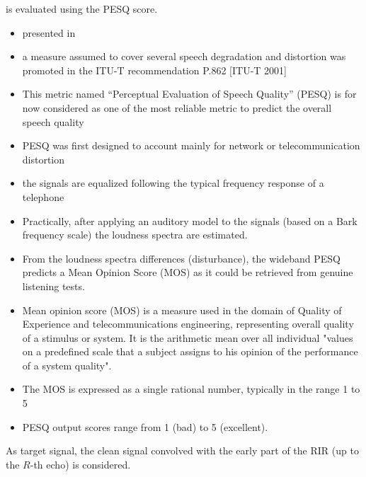  is evaluated using the PESQ score.
\begin{itemize}
    \item presented in~
    \item a measure assumed to cover several speech degradation and distortion was promoted in the ITU-T recommendation P.862 [ITU-T 2001]
    \item This metric named “Perceptual Evaluation of Speech Quality” (PESQ) is for now considered as one of the most reliable metric to predict the overall speech quality
    \item PESQ was first designed to account mainly for network or telecommunication distortion
    \item the signals are equalized following the typical frequency response of a telephone
    \item Practically, after applying an auditory model to the signals (based on a Bark frequency scale) the loudness spectra are estimated.
    \item From the loudness spectra differences (disturbance), the wideband PESQ predicts a Mean Opinion Score (MOS) as it could be retrieved from genuine listening tests.
    \item Mean opinion score (MOS) is a measure used in the domain of Quality of Experience and telecommunications engineering, representing overall quality of a stimulus or system. It is the arithmetic mean over all individual "values on a predefined scale that a subject assigns to his opinion of the performance of a system quality".
    \item The MOS is expressed as a single rational number, typically in the range 1 to 5
    \item PESQ output scores range from 1 (bad) to 5 (excellent).
\end{itemize}

As target signal, the clean signal convolved with the early part of the RIR (up to the $R$-th echo) is considered.

